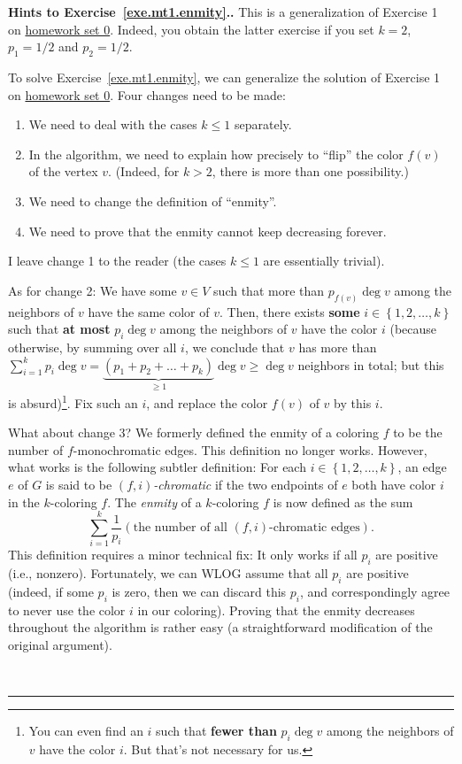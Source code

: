 \documentclass[numbers=enddot,12pt,final,onecolumn,notitlepage]{scrartcl}%
\newcounter{exer}
\theoremstyle{definition}
\newenvironment{proof}[1][Proof]{\noindent\textbf{#1.} }{\ \rule{0.5em}{0.5em}}
\let\sumnonlimits\sum
\renewcommand{\sum}{\sumnonlimits\limits}
\newcommand{\set}[1]{\left\{ #1 \right\}}
\newcommand{\tup}[1]{\left( #1 \right)}
\begin{document}
\begin{proof}[Hints to Exercise~\ref{exe.mt1.enmity}.]
This is a generalization of Exercise 1 on
\href{http://www.cip.ifi.lmu.de/~grinberg/t/17s/hw0s.pdf}{homework set 0}.
Indeed, you obtain the latter exercise if you set $k = 2$, $p_1 = 1/2$
and $p_2 = 1/2$.

To solve Exercise~\ref{exe.mt1.enmity}, we can generalize the solution
of Exercise 1 on
\href{http://www.cip.ifi.lmu.de/~grinberg/t/17s/hw0s.pdf}{homework set 0}.
Four changes need to be made:

\begin{enumerate}
\item We need to deal with the cases $k \leq 1$ separately.
\item In the algorithm, we need to explain how precisely to ``flip''
      the color $f\tup{v}$ of the vertex $v$. (Indeed, for $k > 2$,
      there is more than one possibility.)
\item We need to change the definition of ``enmity''.
\item We need to prove that the enmity cannot keep decreasing forever.
\end{enumerate}

I leave change 1 to the reader (the cases $k \leq 1$ are essentially
trivial).

As for change 2: We have some $v \in V$ such that more than
$p_{f\tup{v}} \deg v$ among the neighbors of $v$ have the same color
of $v$. Then, there exists \textbf{some} $i \in \set{1, 2, \ldots, k}$
such that \textbf{at most} $p_i \deg v$ among the neighbors of $v$
have the color $i$ (because otherwise, by summing over all $i$, we
conclude that $v$ has more than
$\sum_{i=1}^k p_i \deg v
= \underbrace{\tup{p_1+p_2+\ldots+p_k}}_{\geq 1} \deg v
\geq \deg v$ neighbors in total; but this is absurd)\footnote{You can
even find an $i$ such that \textbf{fewer than} $p_i \deg v$ among the
neighbors of $v$ have the color $i$. But that's not necessary for
us.}. Fix such an $i$,
and replace the color $f \tup{v}$ of $v$ by this $i$.

What about change 3? We formerly defined the enmity of a coloring $f$
to be the number of $f$-monochromatic edges. This definition no longer
works. However, what works is the following subtler definition: For
each $i \in \set{1, 2, \ldots, k}$, an edge $e$ of $G$ is said to be
\textit{$\tup{f, i}$-chromatic} if the two endpoints of $e$ both have
color $i$ in the $k$-coloring $f$. The \textit{enmity} of a
$k$-coloring $f$ is now defined as the sum
\[
\sum_{i=1}^k \dfrac{1}{p_i} \tup{ \text{the number of all }
                                  \tup{f, i}\text{-chromatic edges} }.
\]
This definition requires a minor technical fix: It only works if all
$p_i$ are positive (i.e., nonzero). Fortunately, we can WLOG assume
that all $p_i$ are positive (indeed, if some $p_i$ is zero, then
we can discard this $p_i$, and correspondingly agree to never use the
color $i$ in our coloring). Proving that the enmity decreases
throughout the algorithm is rather easy (a straightforward
modification of the original argument).


\end{proof}
\end{document}
